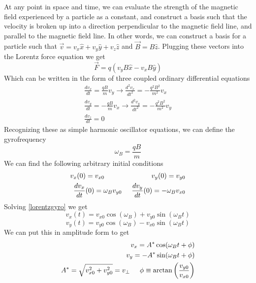 \documentclass[12pt]{article}
\begin{document}
At any point in space and time, we can evaluate the strength of the magnetic field experienced by a particle as a constant, and construct a basis such that the velocity is broken up into a direction perpendicular to the magnetic field line, and parallel to the magnetic field line. In other words, we can construct a basis for a particle such that $\vec{v}=v_x\hat{x}+v_y\hat{y}+v_z\hat{z}$ and $\vec{B}=B\hat{z}$. Plugging these vectors into the Lorentz force equation we get
\begin{equation}\label{lorentzgyrovec}
\vec{F}=q\left(v_yB\hat{x}-v_xB\hat{y}\right)
\end{equation}
Which can be written in the form of three coupled ordinary differential equations
\begin{equation}\label{lorentzgyro}
\begin{split}
\frac{dv_x}{dt}=\frac{qB}{m}v_y\rightarrow\frac{d^2v_x}{dt^2}=-\frac{q^2B^2}{m^2}v_x\\
\frac{dv_y}{dt}=-\frac{qB}{m}v_x\rightarrow\frac{d^2v_y}{dt^2}=-\frac{q^2B^2}{m^2}v_y\\
\frac{dv_z}{dt}=0
\end{split}
\end{equation}
Recognizing these as simple harmonic oscillator equations, we can define the gyrofrequency \cite{Stacey}
\begin{equation}\label{gyrofrequency}
\omega_B=\frac{qB}{m}
\end{equation}
We can find the following arbitrary initial conditions
\begin{equation}\label{initialcond}
\begin{split}
v_x(0)=v_{x0}\hspace{24mm}v_y(0)=v_{y0}\\
\frac{dv_x}{dt}(0)=\omega_Bv_{y0}\hspace{5mm}\frac{dv_y}{dt}(0)=-\omega_Bv_{x0}
\end{split}
\end{equation}
Solving \eqref{lorentzgyro} we get
$$v_x(t)=v_{x0}\cos(\omega_B)+v_{y0}\sin(\omega_Bt)$$
$$v_y(t)=v_{y0}\cos(\omega_B)-v_{x0}\sin(\omega_Bt)$$
We can put this in amplitude form to get
\begin{equation}\label{velocities}
\begin{split}
v_x=A^*\cos(\omega_Bt+\phi)\\
v_y=-A^*\sin(\omega_Bt+\phi)\\
A^*=\sqrt{v_{x0}^2+v_{y0}^2}=v_{\perp}\hspace{5mm}\phi\equiv\arctan\left(\frac{v_{y0}}{v_{x0}}\right)
\end{split}
\end{equation}
\end{document}
